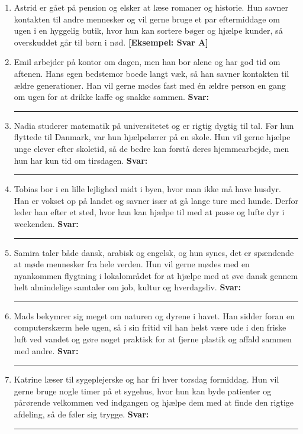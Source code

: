 \begin{enumerate}
  \item[0.] Astrid er gået på pension og elsker at læse romaner og historie. Hun savner kontakten til andre mennesker og vil gerne bruge et par eftermiddage om ugen i en hyggelig butik, hvor hun kan sortere bøger og hjælpe kunder, så overskuddet går til børn i nød. \hfill \textcolor{NCDRed}{\textbf{[Eksempel: Svar A]}}

  \item[1.] Emil arbejder på kontor om dagen, men han bor alene og har god tid om aftenen. Hans egen bedstemor boede langt væk, så han savner kontakten til ældre generationer. Han vil gerne mødes fast med én ældre person en gang om ugen for at drikke kaffe og snakke sammen. \hfill \textbf{Svar:}\ \rule{1.2cm}{0.4pt}

  \item[2.] Nadia studerer matematik på universitetet og er rigtig dygtig til tal. Før hun flyttede til Danmark, var hun hjælpelærer på en skole. Hun vil gerne hjælpe unge elever efter skoletid, så de bedre kan forstå deres hjemmearbejde, men hun har kun tid om tirsdagen. \hfill \textbf{Svar:}\ \rule{1.2cm}{0.4pt}

  \item[3.] Tobias bor i en lille lejlighed midt i byen, hvor man ikke må have husdyr. Han er vokset op på landet og savner især at gå lange ture med hunde. Derfor leder han efter et sted, hvor han kan hjælpe til med at passe og lufte dyr i weekenden. \hfill \textbf{Svar:}\ \rule{1.2cm}{0.4pt}

  \item[4.] Samira taler både dansk, arabisk og engelsk, og hun synes, det er spændende at møde mennesker fra hele verden. Hun vil gerne mødes med en nyankommen flygtning i lokalområdet for at hjælpe med at øve dansk gennem helt almindelige samtaler om job, kultur og hverdagsliv. \hfill \textbf{Svar:}\ \rule{1.2cm}{0.4pt}

  \item[5.] Mads bekymrer sig meget om naturen og dyrene i havet. Han sidder foran en computerskærm hele ugen, så i sin fritid vil han helst være ude i den friske luft ved vandet og gøre noget praktisk for at fjerne plastik og affald sammen med andre. \hfill \textbf{Svar:}\ \rule{1.2cm}{0.4pt}

  \item[6.] Katrine læser til sygeplejerske og har fri hver torsdag formiddag. Hun vil gerne bruge nogle timer på et sygehus, hvor hun kan byde patienter og pårørende velkommen ved indgangen og hjælpe dem med at finde den rigtige afdeling, så de føler sig trygge. \hfill \textbf{Svar:}\ \rule{1.2cm}{0.4pt}
\end{enumerate}

